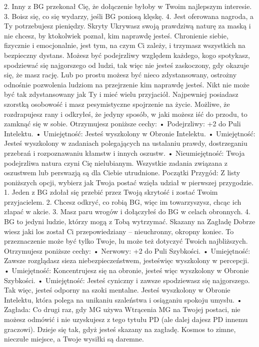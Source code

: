2. Inny z BG przekonał Cię, że dołączenie byłoby w Twoim najlepszym interesie.
3. Boisz się, co się wydarzy, jeśli BG poniosą klęskę.
4. Jest oferowana nagroda, a Ty potrzebujesz pieniędzy.
Skryty
Ukrywasz swoją prawdziwą naturę za maską i nie chcesz, by ktokolwiek poznał, kim naprawdę jesteś. Chronienie siebie, fizycznie i emocjonalnie, jest tym, na czym Ci zależy, i trzymasz wszystkich na bezpieczny dystans. Możesz być podejrzliwy względem każdego, kogo spotykasz, spodziewać się najgorszego od ludzi, tak więc nie jesteś zaskoczony, gdy okazuje się, że masz rację. Lub po prostu możesz być nieco zdystansowany, ostrożny odnośnie pozwolenia ludziom na przejrzenie kim naprawdę jesteś.
Nikt nie może być tak zdystansowany jak Ty i mieć wielu przyjaciół. Najpewniej posiadasz szorstką osobowość i masz pesymistyczne spojrzenie na życie. Możliwe, że rozdrapujesz rany i odkryłeś, że jedyny sposób, w jaki możesz iść do przodu, to zamknąć się w sobie.
Otrzymujesz poniższe cechy:
    • Podejrzliwy: +2 do Puli Intelektu.
    • Umiejętność: Jesteś wyszkolony w Obronie Intelektu.
    • Umiejętność: Jesteś wyszkolony w zadaniach polegających na ustalaniu prawdy, dostrzeganiu przebrań i rozpoznawaniu kłamstw i innych oszustw.
    • Nieumiejętność: Twoja podejrzliwa natura czyni Cię nielubianym. Wszystkie zadania związana z oszustwem lub perswazją są dla Ciebie utrudnione.
Początki Przygód: Z listy poniższych opcji, wybierz jak Twoja postać wzięła udział w pierwszej przygodzie.
1. Jeden z BG zdołał się przebić przez Twoją skrytość i zostać Twoim przyjacielem.
2. Chcesz odkryć, co robią BG, więc im towarzyszysz, chcąc ich złapać w akcie.
3. Masz paru wrogów i dołączyłeś do BG w celach obronnych.
4. BG to jedyni ludzie, którzy mogą z Tobą wytrzymać.
Skazany na Zagładę
Dobrze wiesz jaki los został Ci przepowiedziany – nieuchronny, okropny koniec. To przeznaczenie może być tylko Twoje, lu może też dotyczyć Twoich najbliższych.
Otrzymujesz poniższe cechy:
    • Nerwowy: +2 do Puli Szybkości.
    • Umiejętność: Zawsze rozglądasz sieza niebezpieczeństwem, jesteświęc wyszkolony w percepcji.
    • Umiejętność: Koncentrujesz się na obronie, jesteś więc wyszkolony w Obronie Szybkości.
    • Umiejętność: Jesteś cyniczny i zawsze spodziewasz się najgorszego. Tak więc, jesteś odporny na szoki mentalne. Jesteś wyszkolony w Obronie Intelektu, która polega na unikaniu szaleństwa i osiąganiu spokoju umysłu.
    • Zagłada: Co drugi raz, gdy MG używa Wtrącenia MG na Twojej postaci, nie możesz odmówić i nie uzyskujesz z tego tytułu PD (ale dalej dajesz PD innemu graczowi). Dzieje się tak, gdyż jesteś skazany na zagładę. Kosmos to zimne, nieczułe miejsce, a Twoje wysiłki są daremne.
